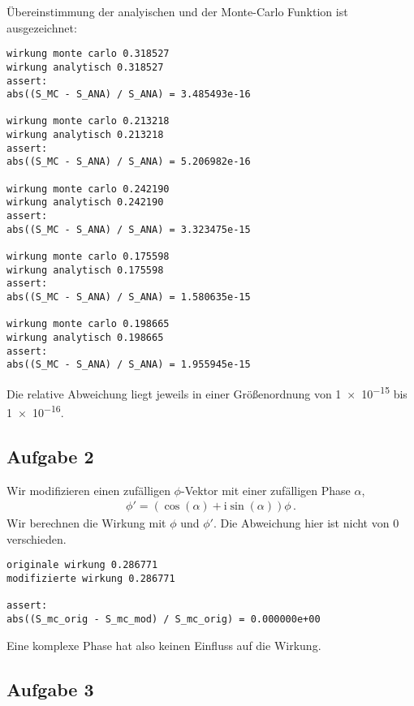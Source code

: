 \documentclass[10pt,a4paper]{article}
\begin{document}
Übereinstimmung der analyischen und der Monte-Carlo Funktion ist ausgezeichnet:
\begin{verbatim}
wirkung monte carlo 0.318527
wirkung analytisch 0.318527
assert:
abs((S_MC - S_ANA) / S_ANA) = 3.485493e-16

wirkung monte carlo 0.213218
wirkung analytisch 0.213218
assert:
abs((S_MC - S_ANA) / S_ANA) = 5.206982e-16

wirkung monte carlo 0.242190
wirkung analytisch 0.242190
assert:
abs((S_MC - S_ANA) / S_ANA) = 3.323475e-15

wirkung monte carlo 0.175598
wirkung analytisch 0.175598
assert:
abs((S_MC - S_ANA) / S_ANA) = 1.580635e-15

wirkung monte carlo 0.198665
wirkung analytisch 0.198665
assert:
abs((S_MC - S_ANA) / S_ANA) = 1.955945e-15
\end{verbatim}
Die relative Abweichung liegt jeweils in einer Größenordnung von \num{1e-15} bis \num{1e-16}.

\subsection{Aufgabe 2}

Wir modifizieren einen zufälligen $\phi$-Vektor mit einer zufälligen Phase
$\alpha$,
\begin{align*}
  \phi' = \left( \cos\left( \alpha \right) + \mathrm{i}\sin\left( \alpha \right) \right) \phi\,.
\end{align*}
Wir berechnen die Wirkung mit $\phi$ und $\phi'$. Die Abweichung hier ist
nicht von \num{0} verschieden.
\begin{verbatim}
originale wirkung 0.286771
modifizierte wirkung 0.286771

assert:
abs((S_mc_orig - S_mc_mod) / S_mc_orig) = 0.000000e+00
\end{verbatim}
Eine komplexe Phase hat also keinen Einfluss auf die Wirkung.

\subsection{Aufgabe 3}
\end{document}
